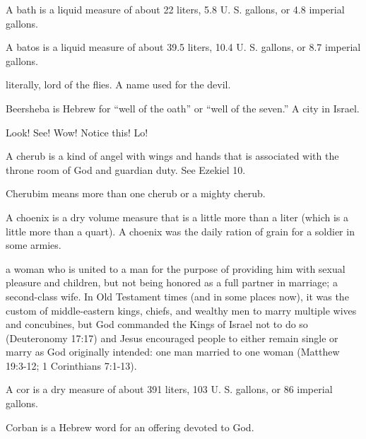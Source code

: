 \begin{multicols}{2}
A bath is a liquid measure of about 22 liters, 5.8 U. S. gallons, or
4.8 imperial gallons.

A batos is a liquid measure of about 39.5 liters, 10.4 U. S. gallons,
or 8.7 imperial gallons.

literally, lord of the flies. A name used for the devil.

Beersheba is Hebrew for {``}well of the oath{''} or {``}well of the
seven.{''} A city in Israel.

Look! See! Wow! Notice this! Lo!

A cherub is a kind of angel with wings and hands that is associated
with the throne room of God and guardian duty. See Ezekiel 10.

Cherubim means more than one cherub or a mighty cherub.

A choenix is a dry volume measure that is a little more than a liter
(which is a little more than a quart). A choenix was the daily ration
of grain for a soldier in some armies.

a woman who is united to a man for the purpose of providing him with
sexual pleasure and children, but not being honored as a full partner
in marriage; a second-class wife. In Old Testament times (and in some
places now), it was the custom of middle-eastern kings, chiefs, and
wealthy men to marry multiple wives and concubines, but God commanded
the Kings of Israel not to do so (Deuteronomy 17:17) and Jesus
encouraged people to either remain single or marry as God originally
intended: one man married to one woman (Matthew 19:3-12; 1
Corinthians 7:1-13).

A cor is a dry measure of about 391 liters, 103 U. S. gallons, or 86
imperial gallons.

Corban is a Hebrew word for an offering devoted to God.


\end{multicols}
